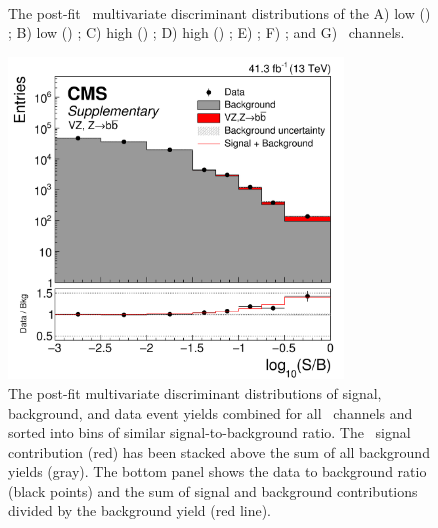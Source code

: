 \begin{figure}[htbp]
{     \qquad
  }
  \mbox{
  }
  \caption[\VZbb\ Signal Region Distributions]{The post-fit \VZbb\ multivariate discriminant distributions of the A) low \pT(\bosV) \ZeeH; B) low \pT(\bosV) \ZmmH; C) high \pT(\bosV) \ZeeH; D) high \pT(\bosV) \ZmmH; E) \WenH; F) \WmnH; and G) \ZnnH\ channels.}
  \label{fig:SRVZbb}
\end{figure}

\begin{figure}[htbp]
  \centering
    \includegraphics[width=3.5in]{images/CMS-HIG-18-016_Figure-aux_009}
    \caption[\VZbb\ Combined Signal Region Distribution]{The post-fit multivariate discriminant distributions of signal, background, and data event yields combined for all \VZbb\ channels and sorted into bins of similar signal-to-background ratio. The \VZbb\ signal contribution (red) has been stacked above the sum of all background yields (gray). The bottom panel shows the data to background ratio (black points) and the sum of signal and background contributions divided by the background yield (red line).}
    \label{fig:SBVZbb}
\end{figure}


